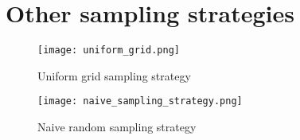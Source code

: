 \documentclass[11pt]{article}
\begin{document}
\fi

\begin{appendices}


\section{}\label{section: Appendix A}
\newpage
\section{Other sampling strategies}\label{section: Appendix-sample}
\begin{figure}[h!]
  \begin{center}
  \caption{Uniform grid sampling strategy} 
  \label{fig: uniform_grid}
  \texttt{[image: uniform\_grid.png]}
  \end{center}
  \end{figure}

  \begin{figure}[h!]
    \begin{center}
    \caption{Naive random sampling strategy} 
    \label{fig: random_sample}
    \texttt{[image: naive\_sampling\_strategy.png]}
    \end{center}
    \end{figure}

\end{appendices}
\ifdefined\COMPILINGMAIN
\else
\end{document}
